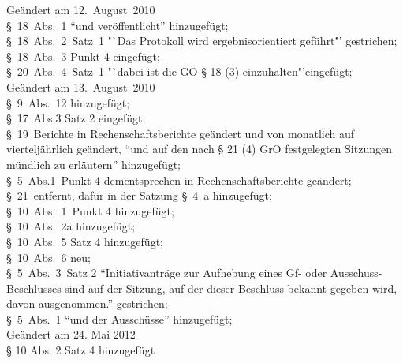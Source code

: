 Geändert am 12.~August~2010\\
§~18~Abs.~1 "`und veröffentlicht"' hinzugefügt;\\
§~18~Abs.~2~Satz~1 "`Das Protokoll wird ergebnisorientiert geführt\."' gestrichen;\\
§~18~Abs.~3 Punkt 4 eingefügt;\\
§~20~Abs.~4~Satz~1 "`dabei ist die GO § 18 (3) einzuhalten\."'eingefügt;\\

Geändert am 13.~August~2010\\ %
§~9~Abs.~12 hinzugefügt;\\
§~17~Abs.3 Satz 2 eingefügt;\\
§~19~Berichte in Rechenschaftsberichte geändert und von monatlich auf vierteljährlich geändert, "`und auf den nach § 21 (4) GrO festgelegten Sitzungen mündlich zu erläutern"' hinzugefügt;\\
§~5~Abs.1~Punkt 4 dementsprechen in Rechenschaftsberichte geändert;\\
§~21~entfernt, dafür in der Satzung §~4~a hinzugefügt;\\
§~10~Abs.~1~Punkt 4 hinzugefügt;\\
§~10~Abs.~2a hinzugefügt;\\
§~10~Abs.~5 Satz 4 hinzugefügt;\\
§~10~Abs.~6 neu;\\
§~5~Abs.~3~Satz 2 "`Initiativanträge zur Aufhebung eines Gf- oder Ausschuss-Beschlusses sind auf der Sitzung, auf der dieser Beschluss bekannt gegeben wird, davon ausgenommen."' gestrichen;\\
§~5~Abs.~1 "`und der Ausschüsse"' hinzugefügt;\\

Geändert am 24. Mai 2012\\
§ 10 Abs. 2 Satz 4 hinzugefügt\\

\normalsize
